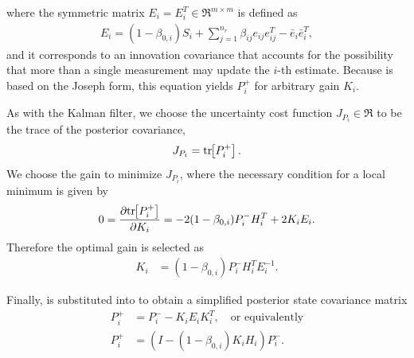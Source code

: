 where the symmetric matrix $E_i=E_i^T\in\Re^{m\times m}$ is defined as
\begin{align}
E_i=(1-\beta_{0,i})S_i+{\sum_{j=1}^{n_r} \beta_{ij}e_{ij}e_{ij}^T-{\bar{e}}_{i}}{\bar{e}}_{i}^T,\label{eqn:E}
\end{align}
and it corresponds to an innovation covariance that accounts for the possibility that more than a single measurement may update the $i$-th estimate.
Because  is based on the Joseph form, this equation yields $P^+_{i}$ for arbitrary gain $K_i$.

As with the Kalman filter, we choose the uncertainty cost function $J_{P_i}\in\Re$ to be the trace of the posterior covariance,
\begin{align}
\label{eqn:JpIntro}
J_{P_i}=\mathrm{tr}\negthickspace\left[ P_i^+ \right].
\end{align}
We choose the gain to minimize $J_{P_i}$, where the necessary condition for a local minimum is given by
\begin{align}
0=\frac{\partial\mathrm{tr}\negthickspace\left[ P^+_i \right]}{\partial K_i}=-2(1-\beta_{0,i})P^-_iH_i^T+2K_iE_i.\label{eqn:Uncertainty0}
\end{align}
Therefore the optimal gain is selected as
\begin{align}
K_i&=(1-\beta_{0,i})P^-_iH_i^TE_i^{-1}.\label{eqn:GainK}
\end{align}

Finally,  is substituted into  to obtain a simplified posterior state covariance matrix
\begin{align}
P^+_{i}&=P^-_{i}-K_iE_iK_i^T, \quad \mbox{or equivalently}\label{eqn:JPDAFPostCovSymmetricUpdate}
\\
P^+_{i}&=\left(I-(1-\beta_{0,i})K_iH_i\right)P^-_i.\label{eqn:JPDAFPostCovSimpleUpdate}
\end{align}

